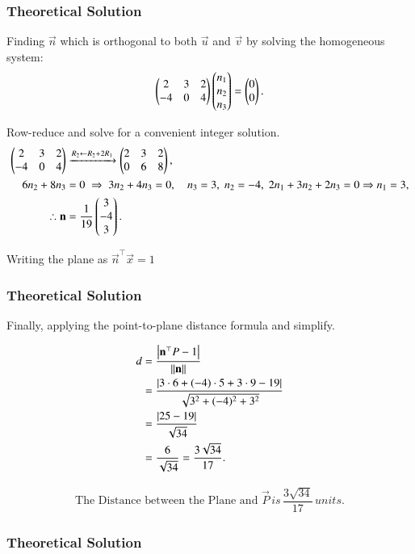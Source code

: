 \documentclass{beamer}
\begin{document}
\begin{frame}[fragile]
\frametitle{Theoretical Solution}

Finding $\vec{n}$ which is orthogonal to both $\vec{u}$ and $\vec{v}$ by solving the homogeneous system:
\begin{equation}
\begin{pmatrix}2 & 3 & 2\\ -4 & 0 & 4\end{pmatrix}\begin{pmatrix}n_1\\n_2\\n_3\end{pmatrix}=\begin{pmatrix}0\\0\end{pmatrix}.
\end{equation}

Row-reduce and solve for a convenient integer solution.
\begin{align}
\begin{pmatrix}2 & 3 & 2\\ -4 & 0 & 4\end{pmatrix}
&\xrightarrow{R_2\leftarrow R_2+2R_1}
\begin{pmatrix}2 & 3 & 2\\ 0 & 6 & 8\end{pmatrix},\\
6n_2+8n_3&=0 \;\Rightarrow\; 3n_2+4n_3=0, \quad
n_3=3,\; n_2=-4,\; 2n_1+3n_2+2n_3=0 \Rightarrow n_1=3,\\
\therefore \mathbf{n} &= \frac{1}{19}\begin{pmatrix}3\\-4\\3\end{pmatrix}.
\end{align}

Writing the plane as $\vec{n}^\top \vec{x} = 1$
\end{frame}


\begin{frame}[fragile]
    \frametitle{Theoretical Solution}

Finally, applying the point-to-plane distance formula and simplify.

\begin{align}
d &= \frac{\left\vert\mathbf{n}^\top P - 1\right\vert}{\left\lVert\mathbf{n}\right\rVert}\\
&= \frac{\left\vert3\cdot 6+(-4)\cdot 5+3\cdot 9-19\right\vert}{\sqrt{3^2+(-4)^2+3^2}}\\
&= \frac{\left\vert25-19\right\vert}{\sqrt{34}}\\
&= \frac{6}{\sqrt{34}}=\frac{3\sqrt{34}}{17}.
\end{align}

\begin{align}
    \boxed{\text{The Distance between the Plane and } \vec{P} \, is \, \dfrac{3\sqrt{34}}{17} \, units.}
\end{align}
\end{frame}

\begin{frame}[fragile]
    \frametitle{Theoretical Solution}
\end{frame}
\end{document}
